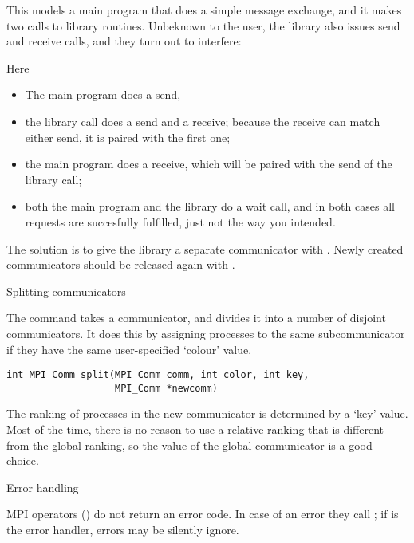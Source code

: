 
This models a main program that does a simple message exchange, and it
makes two calls to library routines. Unbeknown to the user, the library also issues send and receive calls, and they turn out to interfere:


Here
\begin{itemize}
\item The main program does a send,
\item the library call  does a send and a receive;
  because the receive can match either send, it is paired with the
  first one;
\item the main program does a receive, which will be paired with the send of the 
  library call;
\item both the main program and the library do a wait call, and in
  both cases all requests are succesfully fulfilled, just not the way
  you intended.
\end{itemize}

The solution is to give the library a separate communicator with
. Newly created communicators should be
released again with .


 {Splitting communicators}

The command  takes a communicator, and
divides it into a number of disjoint communicators. It does this by
assigning processes to the same subcommunicator if they have the same
user-specified `colour' value.
\begin{verbatim}
int MPI_Comm_split(MPI_Comm comm, int color, int key, 
                   MPI_Comm *newcomm)
\end{verbatim}
The ranking of processes in the new communicator is determined by a `key' value.
Most of the time, there is no reason to use a relative ranking that is different from
the global ranking, so the  value of the global communicator
is a good choice.

 {Error handling}

MPI operators () do not return an error code. In case of
an error they call ; if 
is the error handler, errors may be silently ignore.

